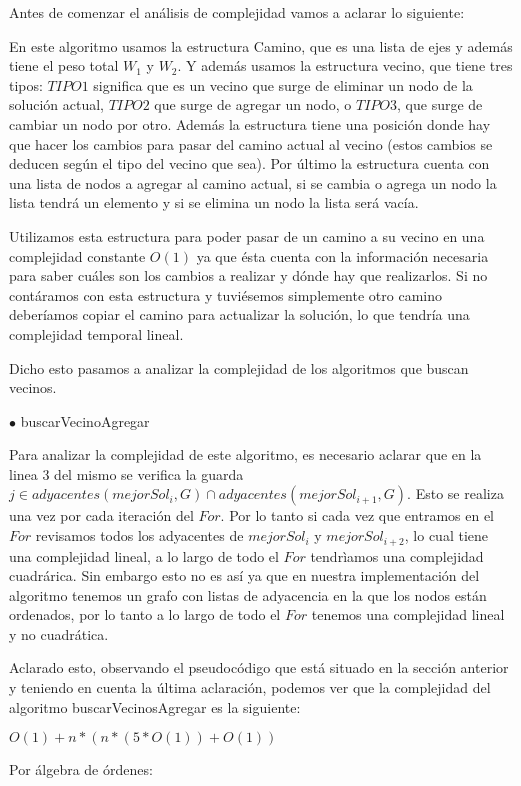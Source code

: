 Antes de comenzar el análisis de complejidad vamos a aclarar lo siguiente:

En este algoritmo usamos la estructura Camino, que es una lista de ejes y además tiene el peso total $W_1$ y $W_2$. Y además usamos la estructura vecino, que tiene tres tipos: $TIPO1$ significa que es un vecino que surge de eliminar un nodo de la solución actual, $TIPO2$ que surge de agregar un nodo, o $TIPO3$, que surge de cambiar un nodo por otro. Además la estructura tiene una posición donde hay que hacer los cambios para pasar del camino actual al vecino (estos cambios se deducen según el tipo del vecino que sea). Por último la estructura cuenta con una lista de nodos a agregar al camino actual, si se cambia o agrega un nodo la lista tendrá un elemento y si se elimina un nodo la lista será vacía.

Utilizamos esta estructura para poder pasar de un camino a su vecino en una complejidad constante $O(1)$ ya que ésta cuenta con la información necesaria para saber cuáles son los cambios a realizar y dónde hay que realizarlos. Si no contáramos con esta estructura y tuviésemos simplemente otro camino deberíamos copiar el camino para actualizar la solución, lo que tendría una complejidad temporal lineal.

Dicho esto pasamos a analizar la complejidad de los algoritmos que buscan vecinos.

$\bullet$ buscarVecinoAgregar

Para analizar la complejidad de este algoritmo, es necesario aclarar que en la linea $3$ del mismo se verifica la guarda $j \in adyacentes(mejorSol_i,G) \cap adyacentes(mejorSol_{i+1},G)$. Esto se realiza una vez por cada iteración del $For$. Por lo tanto si cada vez que entramos en el $For$ revisamos todos los adyacentes de $mejorSol_i$ y $mejorSol_{i+2}$, lo cual tiene una complejidad lineal, a lo largo de todo el $For$ tendrìamos una complejidad cuadrárica. Sin embargo esto no es así ya que en nuestra implementación del algoritmo tenemos un grafo con listas de adyacencia en la que los nodos están ordenados, por lo tanto a lo largo de todo el $For$ tenemos una complejidad lineal y no cuadrática.

Aclarado esto, observando el pseudocódigo que está situado en la sección anterior y teniendo en cuenta la última aclaración, podemos ver que la complejidad del algoritmo buscarVecinosAgregar es la siguiente:

$O(1) + n*(n*(5*O(1))+O(1))$

Por álgebra de órdenes:

